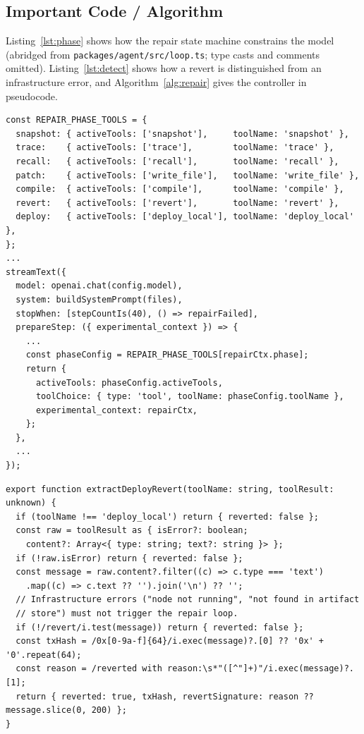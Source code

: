 \documentclass[11pt,letterpaper]{article}
\begin{document}
\subsection{Important Code / Algorithm}
Listing~\ref{lst:phase} shows how the repair state machine constrains the model (abridged from \texttt{packages/agent/\allowbreak src/loop.ts}; type casts and comments omitted). Listing~\ref{lst:detect} shows how a revert is distinguished from an infrastructure error, and Algorithm~\ref{alg:repair} gives the controller in pseudocode.

\begin{lstlisting}[language=TS,caption={Per-phase tool restriction and forced tool choice (abridged).},label={lst:phase}]
const REPAIR_PHASE_TOOLS = {
  snapshot: { activeTools: ['snapshot'],     toolName: 'snapshot' },
  trace:    { activeTools: ['trace'],        toolName: 'trace' },
  recall:   { activeTools: ['recall'],       toolName: 'recall' },
  patch:    { activeTools: ['write_file'],   toolName: 'write_file' },
  compile:  { activeTools: ['compile'],      toolName: 'compile' },
  revert:   { activeTools: ['revert'],       toolName: 'revert' },
  deploy:   { activeTools: ['deploy_local'], toolName: 'deploy_local' },
};
...
streamText({
  model: openai.chat(config.model),
  system: buildSystemPrompt(files),
  stopWhen: [stepCountIs(40), () => repairFailed],
  prepareStep: ({ experimental_context }) => {
    ...
    const phaseConfig = REPAIR_PHASE_TOOLS[repairCtx.phase];
    return {
      activeTools: phaseConfig.activeTools,
      toolChoice: { type: 'tool', toolName: phaseConfig.toolName },
      experimental_context: repairCtx,
    };
  },
  ...
});
\end{lstlisting}

\begin{lstlisting}[language=TS,caption={Revert detection: only genuine EVM reverts start the repair loop (abridged).},label={lst:detect}]
export function extractDeployRevert(toolName: string, toolResult: unknown) {
  if (toolName !== 'deploy_local') return { reverted: false };
  const raw = toolResult as { isError?: boolean;
    content?: Array<{ type: string; text?: string }> };
  if (!raw.isError) return { reverted: false };
  const message = raw.content?.filter((c) => c.type === 'text')
    .map((c) => c.text ?? '').join('\n') ?? '';
  // Infrastructure errors ("node not running", "not found in artifact
  // store") must not trigger the repair loop.
  if (!/revert/i.test(message)) return { reverted: false };
  const txHash = /0x[0-9a-f]{64}/i.exec(message)?.[0] ?? '0x' + '0'.repeat(64);
  const reason = /reverted with reason:\s*"([^"]+)"/i.exec(message)?.[1];
  return { reverted: true, txHash, revertSignature: reason ?? message.slice(0, 200) };
}
\end{lstlisting}
\end{document}
